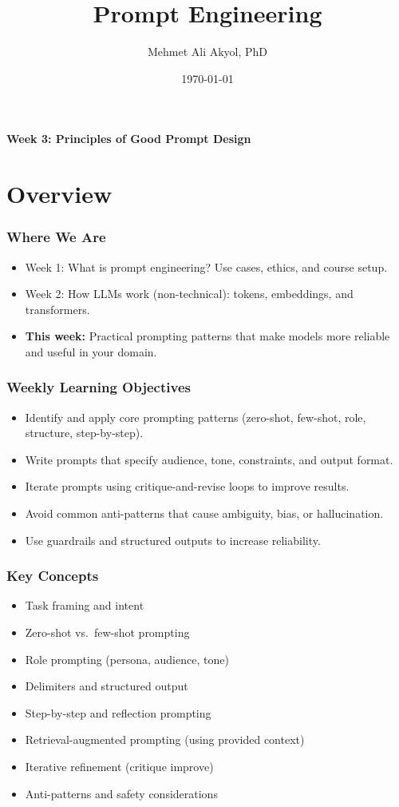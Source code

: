 \documentclass{beamer}
\title{Prompt Engineering}
\author{Mehmet Ali Akyol, PhD}
\institute{Ankara Medipol University}
\date{\today}
\begin{document}
\begin{frame}
	\titlepage
	\begin{center}
		\vspace{1cm}
			\textbf{Week 3: Principles of Good Prompt Design}
	\end{center}
\end{frame}

\section{Overview}

\begin{frame}
	\frametitle{Where We Are}
	\begin{itemize}
		\item Week 1: What is prompt engineering? Use cases, ethics, and course setup.
		\item Week 2: How LLMs work (non-technical): tokens, embeddings, and transformers.
		\item \textbf{This week:} Practical prompting patterns that make models more reliable and useful in your domain.
	\end{itemize}
\end{frame}

\begin{frame}
	\frametitle{Weekly Learning Objectives}
	\begin{itemize}
		\item Identify and apply core prompting patterns (zero-shot, few-shot, role, structure, step-by-step).
		\item Write prompts that specify audience, tone, constraints, and output format.
		\item Iterate prompts using critique-and-revise loops to improve results.
		\item Avoid common anti-patterns that cause ambiguity, bias, or hallucination.
		\item Use guardrails and structured outputs to increase reliability.
	\end{itemize}
\end{frame}

\begin{frame}
	\frametitle{Key Concepts}
	\begin{itemize}
		\item Task framing and intent
		\item Zero-shot vs.~few-shot prompting
		\item Role prompting (persona, audience, tone)
		\item Delimiters and structured output
		\item Step-by-step and reflection prompting
		\item Retrieval-augmented prompting (using provided context)
		\item Iterative refinement (critique \textrightarrow{} improve)
		\item Anti-patterns and safety considerations
	\end{itemize}
\end{frame}
\end{document}
